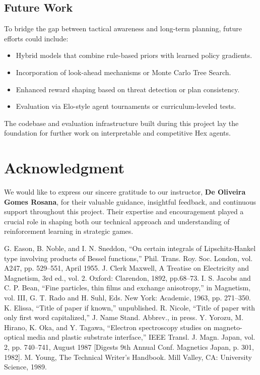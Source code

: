 \documentclass[conference]{IEEEtran}
\begin{document}
\subsection*{Future Work}

To bridge the gap between tactical awareness and long-term planning, future efforts could include:
\begin{itemize}
    \item Hybrid models that combine rule-based priors with learned policy gradients.
    \item Incorporation of look-ahead mechanisms or Monte Carlo Tree Search.
    \item Enhanced reward shaping based on threat detection or plan consistency.
    \item Evaluation via Elo-style agent tournaments or curriculum-leveled tests.
\end{itemize}

The codebase and evaluation infrastructure built during this project lay the foundation for further work on interpretable and competitive Hex agents.

\section*{Acknowledgment}

We would like to express our sincere gratitude to our instructor, \textbf{De Oliveira Gomes Rosana}, for their valuable guidance, insightful feedback, and continuous support throughout this project. Their expertise and encouragement played a crucial role in shaping both our technical approach and understanding of reinforcement learning in strategic games. 


\begin{thebibliography}{00}
 G. Eason, B. Noble, and I. N. Sneddon, ``On certain integrals of Lipschitz-Hankel type involving products of Bessel functions,'' Phil. Trans. Roy. Soc. London, vol. A247, pp. 529--551, April 1955.
 J. Clerk Maxwell, A Treatise on Electricity and Magnetism, 3rd ed., vol. 2. Oxford: Clarendon, 1892, pp.68--73.
 I. S. Jacobs and C. P. Bean, ``Fine particles, thin films and exchange anisotropy,'' in Magnetism, vol. III, G. T. Rado and H. Suhl, Eds. New York: Academic, 1963, pp. 271--350.
 K. Elissa, ``Title of paper if known,'' unpublished.
 R. Nicole, ``Title of paper with only first word capitalized,'' J. Name Stand. Abbrev., in press.
 Y. Yorozu, M. Hirano, K. Oka, and Y. Tagawa, ``Electron spectroscopy studies on magneto-optical media and plastic substrate interface,'' IEEE Transl. J. Magn. Japan, vol. 2, pp. 740--741, August 1987 [Digests 9th Annual Conf. Magnetics Japan, p. 301, 1982].
 M. Young, The Technical Writer's Handbook. Mill Valley, CA: University Science, 1989.
\end{thebibliography}
\vspace{12pt}
\color{red}
\end{document}
